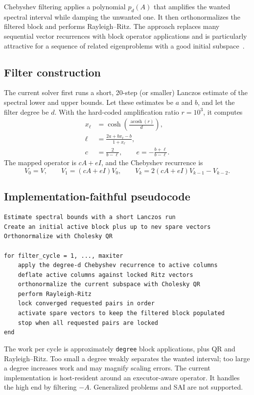 \documentclass[11pt]{article}
\newcommand{\code}[1]{\texttt{#1}}
\begin{document}
Chebyshev filtering applies a polynomial $p_d(A)$ that amplifies the wanted
spectral interval while damping the unwanted one.  It then orthonormalizes the
filtered block and performs Rayleigh--Ritz.  The approach replaces many
sequential vector recurrences with block operator applications and is
particularly attractive for a sequence of related eigenproblems with a good
initial subspace~\cite{chefsi}.

\subsection{Filter construction}

The current solver first runs a short, 20-step (or smaller) Lanczos estimate of
the spectral lower and upper bounds.  Let these estimates be $a$ and $b$, and
let the filter degree be $d$.  With the hard-coded amplification ratio
$r=10^3$, it computes
\begin{align}
  x_{\ell} &= \cosh\!\left(\frac{\operatorname{acosh}(r)}{d}\right),\\
  \ell &= \frac{2a+bx_{\ell}-b}{1+x_{\ell}},\\
  c &= \frac{2}{b-\ell}, \qquad e=-\frac{b+\ell}{b-\ell}.
\end{align}
The mapped operator is $cA+eI$, and the Chebyshev recurrence is
\begin{equation}
  V_0=V,\qquad V_1=(cA+eI)V_0,\qquad
  V_k=2(cA+eI)V_{k-1}-V_{k-2}.
\end{equation}

\subsection{Implementation-faithful pseudocode}

\begin{lstlisting}
Estimate spectral bounds with a short Lanczos run
Create an initial active block plus up to nev spare vectors
Orthonormalize with Cholesky QR

for filter_cycle = 1, ..., maxiter
    apply the degree-d Chebyshev recurrence to active columns
    deflate active columns against locked Ritz vectors
    orthonormalize the current subspace with Cholesky QR
    perform Rayleigh-Ritz
    lock converged requested pairs in order
    activate spare vectors to keep the filtered block populated
    stop when all requested pairs are locked
end
\end{lstlisting}

The work per cycle is approximately \code{degree} block applications, plus QR
and Rayleigh--Ritz.  Too small a degree weakly separates the wanted interval;
too large a degree increases work and may magnify scaling errors.  The current
implementation is host-resident around an executor-aware operator.  It handles
the high end by filtering $-A$.  Generalized problems and SAI are not supported.
\end{document}
